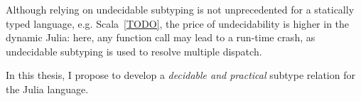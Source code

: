 Although relying on undecidable subtyping is not unprecedented
for a statically typed language, e.g. Scala~\ref{TODO},
the price of undecidability is higher in the dynamic Julia:
here, any function call may lead to a run-time crash,
as undecidable subtyping is used to resolve multiple dispatch.



In this thesis, I propose to develop
a \emph{decidable and practical} subtype relation for the Julia language.

%



